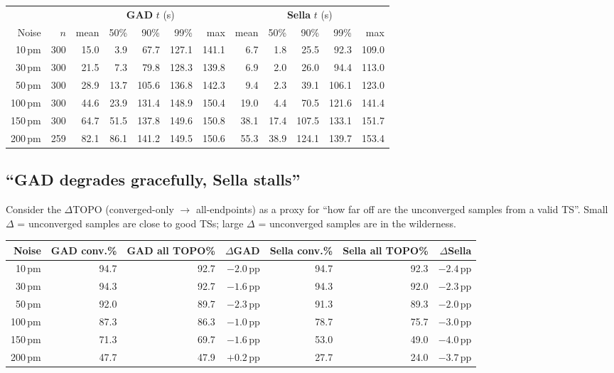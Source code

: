 \documentclass[11pt]{article}
\begin{document}
\begin{center}
\begin{tabular}{rr|rrrrr|rrrrr}
\toprule
& & \multicolumn{5}{c|}{\textbf{GAD} $t$ (s)} & \multicolumn{5}{c}{\textbf{Sella} $t$ (s)} \\
Noise & $n$ & mean & 50\% & 90\% & 99\% & max & mean & 50\% & 90\% & 99\% & max \\
\midrule
10\,pm  & 300 & 15.0 &  3.9 &  67.7 & 127.1 & 141.1 &  6.7 &  1.8 &  25.5 &  92.3 & 109.0 \\
30\,pm  & 300 & 21.5 &  7.3 &  79.8 & 128.3 & 139.8 &  6.9 &  2.0 &  26.0 &  94.4 & 113.0 \\
50\,pm  & 300 & 28.9 & 13.7 & 105.6 & 136.8 & 142.3 &  9.4 &  2.3 &  39.1 & 106.1 & 123.0 \\
100\,pm & 300 & 44.6 & 23.9 & 131.4 & 148.9 & 150.4 & 19.0 &  4.4 &  70.5 & 121.6 & 141.4 \\
150\,pm & 300 & 64.7 & 51.5 & 137.8 & 149.6 & 150.8 & 38.1 & 17.4 & 107.5 & 133.1 & 151.7 \\
200\,pm & 259 & 82.1 & 86.1 & 141.2 & 149.5 & 150.6 & 55.3 & 38.9 & 124.1 & 139.7 & 153.4 \\
\bottomrule
\end{tabular}
\end{center}

\subsection{``GAD degrades gracefully, Sella stalls''}

Consider the $\Delta$TOPO (converged-only $\to$ all-endpoints) as a
proxy for ``how far off are the unconverged samples from a valid TS''.
Small $\Delta$ = unconverged samples are close to good TSs; large
$\Delta$ = unconverged samples are in the wilderness.

\begin{center}
\begin{tabular}{rrrrrrr}
\toprule
Noise & GAD conv.\% & GAD all TOPO\% & $\Delta$GAD
      & Sella conv.\% & Sella all TOPO\% & $\Delta$Sella \\
\midrule
10\,pm  & 94.7 & 92.7 & $-2.0$\,pp  & 94.7 & 92.3 & $-2.4$\,pp  \\
30\,pm  & 94.3 & 92.7 & $-1.6$\,pp  & 94.3 & 92.0 & $-2.3$\,pp  \\
50\,pm  & 92.0 & 89.7 & $-2.3$\,pp  & 91.3 & 89.3 & $-2.0$\,pp  \\
100\,pm & 87.3 & 86.3 & $-1.0$\,pp  & 78.7 & 75.7 & $-3.0$\,pp  \\
150\,pm & 71.3 & 69.7 & $-1.6$\,pp  & 53.0 & 49.0 & $-4.0$\,pp  \\
200\,pm & 47.7 & 47.9 & $+0.2$\,pp  & 27.7 & 24.0 & $-3.7$\,pp  \\
\bottomrule
\end{tabular}
\end{center}
\end{document}
